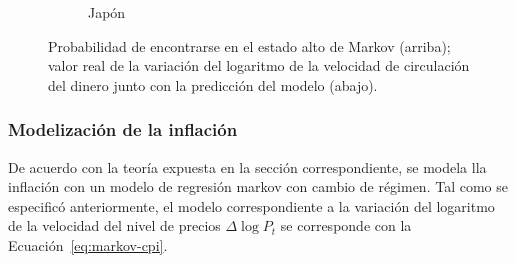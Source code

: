 \documentclass[titlepage, 12pt]{article}
\begin{document}
\begin{figure}
\begin{subfigure}[b]{0.49\textwidth}
        \caption{Japón}
    \end{subfigure}
    \caption{Probabilidad de encontrarse en el estado alto de Markov (arriba); valor real de la variación del logaritmo de la velocidad de circulación del dinero junto con la predicción del modelo (abajo).}
    \label{fig:markov-v}
\end{figure}

\subsubsection{Modelización de la inflación}

De acuerdo con la teoría expuesta en la sección correspondiente, se modela lla inflación con un modelo de regresión markov con cambio de régimen. Tal como se especificó anteriormente, el modelo correspondiente a la variación del logaritmo de la velocidad del nivel de precios $\Delta\log P_t$ se corresponde con la Ecuación~\ref{eq:markov-cpi}.
\end{document}
